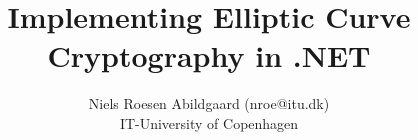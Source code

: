 \title{Implementing Elliptic Curve Cryptography in .NET}
\author{Niels Roesen Abildgaard (nroe@itu.dk)\\IT-University of Copenhagen}
\maketitle